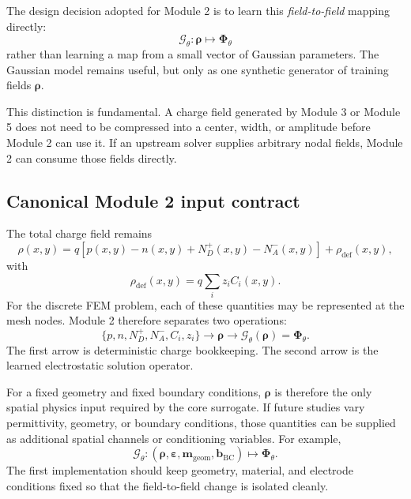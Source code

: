 \documentclass[11pt]{article}
\begin{document}
The design decision adopted for Module 2 is to learn this \emph{field-to-field} mapping directly:
\begin{equation}
\boxed{
\mathcal{G}_{\theta}:\bm{\rho}\mapsto\bm{\Phi}_{\theta}
}
\label{eq:field_operator}
\end{equation}
rather than learning a map from a small vector of Gaussian parameters. The Gaussian model remains useful, but only as one synthetic generator of training fields $\bm{\rho}$.

This distinction is fundamental. A charge field generated by Module 3 or Module 5 does not need to be compressed into a center, width, or amplitude before Module 2 can use it. If an upstream solver supplies arbitrary nodal fields, Module 2 can consume those fields directly.

\subsection{Canonical Module 2 input contract}

The total charge field remains
\begin{equation}
\rho(x,y)=q\left[p(x,y)-n(x,y)+N_D^+(x,y)-N_A^-(x,y)\right]+\rho_{\mathrm{def}}(x,y),
\end{equation}
with
\begin{equation}
\rho_{\mathrm{def}}(x,y)=q\sum_i z_i C_i(x,y).
\end{equation}
For the discrete FEM problem, each of these quantities may be represented at the mesh nodes. Module 2 therefore separates two operations:
\begin{equation}
\{p,n,N_D^+,N_A^-,C_i,z_i\}
\longrightarrow
\bm{\rho}
\longrightarrow
\mathcal{G}_{\theta}(\bm{\rho})=\bm{\Phi}_{\theta}.
\label{eq:component_to_field_to_phi}
\end{equation}
The first arrow is deterministic charge bookkeeping. The second arrow is the learned electrostatic solution operator.

For a fixed geometry and fixed boundary conditions, $\bm{\rho}$ is therefore the only spatial physics input required by the core surrogate. If future studies vary permittivity, geometry, or boundary conditions, those quantities can be supplied as additional spatial channels or conditioning variables. For example,
\begin{equation}
\mathcal{G}_{\theta}:\left(\bm{\rho},\bm{\varepsilon},\bm{m}_{\mathrm{geom}},\bm{b}_{\mathrm{BC}}\right)
\mapsto \bm{\Phi}_{\theta}.
\end{equation}
The first implementation should keep geometry, material, and electrode conditions fixed so that the field-to-field change is isolated cleanly.
\end{document}
